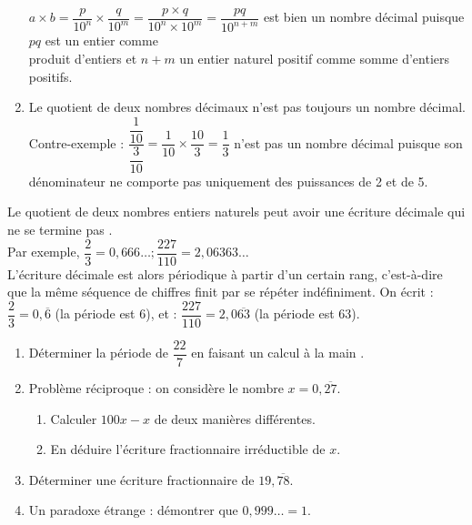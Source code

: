 \begin{corrige}
\begin{enumerate}
        $a\times b =\dfrac{p}{10^n}\times\dfrac{q}{10^m} =\dfrac{p\times q}{10^n\times10^m} =\dfrac{pq}{10^{n+m}}$ est bien un nombre décimal puisque $pq$ est un entier comme \\ [1mm]
        produit d'entiers et $n+m$ un entier naturel positif comme somme d'entiers positifs.
      \item {\blue Le quotient de deux nombres décimaux n'est pas toujours un nombre décimal}. \\
         Contre-exemple : $\dfrac{\dfrac{1}{10}}{\dfrac{3}{10}} =\dfrac{1}{10}\times\dfrac{10}{3} =\dfrac13$ n'est pas un nombre décimal puisque son dénominateur ne comporte pas uniquement des puissances de 2 et de 5.
   \end{enumerate}
\end{corrige}


\bigskip


\begin{exercice}[Ou comment démontrer que 0,999\dots{} = 1] %
   Le quotient de deux nombres entiers naturels peut avoir une écriture décimale qui \og ne se termine pas \fg{}. \\ [1mm]
   Par exemple, $\dfrac23 = 0,666\dots ; \dfrac{227}{110} = 2,06363\dots$ \\ [1mm]   
   L'écriture décimale est alors périodique à partir d'un certain rang, c'est-à-dire que la même séquence de chiffres finit par se répéter indéfiniment. On écrit : \\ [1mm]   
   $\dfrac23 =0,\overline{6}$ (la période est 6), et : $\dfrac{227}{110} =2,0\overline{63}$  (la période est 63). \smallskip
   \begin{enumerate}
      \item Déterminer la période de $\dfrac{22}{7}$ en faisant un calcul \og à la main \fg{}.
     \item Problème réciproque : on considère le nombre $x =0,\overline{27}$.
     \begin{enumerate}
        \item Calculer $100x-x$ de deux manières différentes.
        \item En déduire l'écriture fractionnaire irréductible de $x$.
     \end{enumerate}
     \item Déterminer une écriture fractionnaire de $19,\overline{78}$.
      \item Un \og paradoxe \fg{} étrange : démontrer que $0,999\dots =1$.
  \end{enumerate}
\end{exercice}

